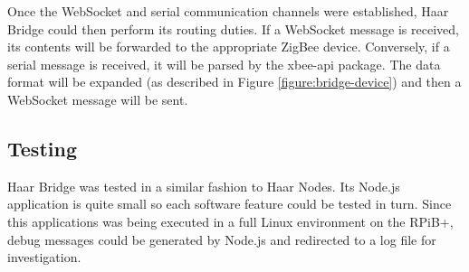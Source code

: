       Once the WebSocket and serial communication channels were established, Haar Bridge could then perform its routing duties. If a WebSocket message is received, its contents will be forwarded to the appropriate ZigBee device. Conversely, if a serial message is received, it will be parsed by the xbee-api package. The data format will be expanded (as described in Figure \ref{figure:bridge-device}) and then a WebSocket message will be sent.

    \subsection{Testing}
      Haar Bridge was tested in a similar fashion to Haar Nodes. Its Node.js application is quite small so each software feature could be tested in turn. Since this applications was being executed in a full Linux environment on the RPiB+, debug messages could be generated by Node.js and redirected to a log file for investigation.   
